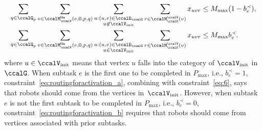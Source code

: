 \documentclass[Afour,sageh,times]{sagej}
\begin{document}
{{{\begin{subequations}\label{eq:routingforactivation}
  \begin{align}
   & \sum_{q\in \ccalQ_p} \sum_{v \in \ccalM^\mathsf{lits}_{\ccalV}(e,0,p,q)} \sum_{\substack{u: (u,v) \in \ccalE_\ccalG \\ u \not\in \ccalV_{\text{init}}}}   \sum_{r\in \ccalM^\ccalV_{\ccalK}(v)} x_{uvr} \leq M_{\text{max}} (1 - b_e^{\prec}),  \label{eq:routingforactivation_a}\\
   & \sum_{q\in \ccalQ_p} \sum_{v \in \ccalM^\mathsf{lits}_{\ccalV}(e,0,p,q)} \sum_{\substack{u: (u,v) \in \ccalE_\ccalG \\ u \in \ccalV_{\text{init}}}}   \sum_{r\in \ccalM^\ccalV_{\ccalK}(v)} x_{uvr} \leq M_{\text{max}}  b_e^{\prec}.  \label{eq:routingforactivation_b}
  \end{align}
\end{subequations}
where $u \in \ccalV_{\text{init}}$ means that vertex $u$ falls into the category of $\ccalV_{\text{init}}$ in $\ccalG$. When subtask $e$ is the first one to be completed in $P_{\text{max}}$, i.e., $b_e^{\prec}=1$, constraint~\eqref{eq:routingforactivation_a}, combining with constraint~\eqref{eq:6}, says that robots should come from the vertices in~$\ccalV_{\text{init}}$. However, when subtask $e$ is not  the first subtask to be completed in $P_{\text{max}}$, i.e., $b_e^\prec=0$, constraint~\eqref{eq:routingforactivation_b} requires that robots should come from vertices associated with prior subtasks.


}}}
\end{document}
